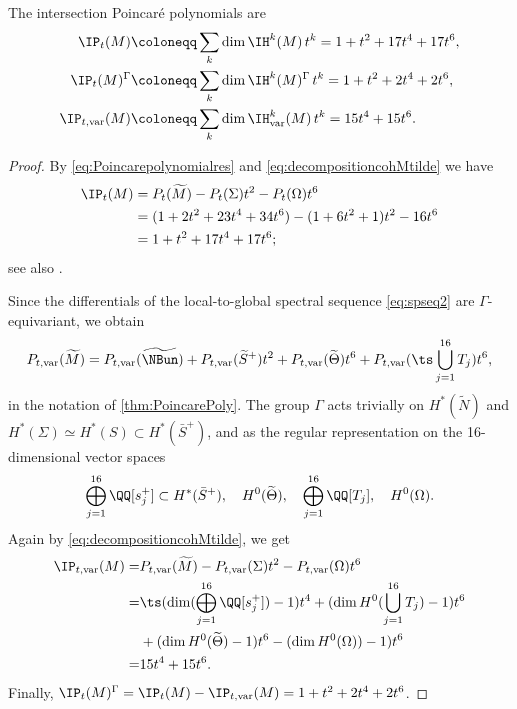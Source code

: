 \begin{prop}\label{prop:Poincarepolynomialintersection}
The intersection Poincaré polynomials are
\begin{align*}
\IP_t(M) & \coloneqq \sum_k \dim \IH^k(M)\,t^k = 1+t^2+17t^4+17t^6, \\
\IP_t(M)^{\Gamma}& \coloneqq \sum_k \dim \IH^k(M)^{\Gamma} \,t^k = 1+t^2+2t^4+2t^6,\\
\IP_{t,{\mathrm{var}}}(M) & \coloneqq \sum_k \dim \IH^k_{\mathrm{var}}(M) \,t^k = 15t^4+15t^6.
\end{align*}
\end{prop}
\begin{proof}

By \eqref{eq:Poincarepolynomialres} and \eqref{eq:decompositioncohMtilde} we have
\begin{align*}
\IP_t(M) & =P_t(\widetilde{M})-P_t(\Sigma)t^2-P_t(\Omega)t^6\\
& = (1+2t^2+23t^4+34t^6)-(1+6t^2+1)t^2 - 16t^6\\
& = 1+t^2+17t^4+17t^6;
\end{align*}
see also \cite[Th.\,6.1]{Felisetti2018}.

Since the differentials of the local-to-global spectral sequence \eqref{eq:spseq2} are $\Gamma$\nobreakdash-equiva\-riant, we obtain
\[
P_{t, \mathrm{var}}(\widetilde{M}) =P_{t, \mathrm{var}}(\widetilde{\NBun}) + P_{t, \mathrm{var}}(\widetilde{S}^+)t^2 + P_{t, \mathrm{var}}(\widetilde{\Theta})t^6 + P_{t, \mathrm{var}}(\ts\bigcup^{16}_{j=1}T_j)t^6,
\]
in the notation of \cref{thm:PoincarePoly}. The group $\Gamma$ acts trivially on $H^*(\widetilde{N})$ and $H^*(\Sigma) \simeq H^*(S) \subset H^*(\bar{S}^+)$, and as the regular representation on the 16-dimensional vector spaces
\[
\bigoplus^{16}_{j=1}\QQ [s^+_j] \subset H^*(\bar{S}^+), \quad H^0(\widetilde{\Theta}), \quad \bigoplus^{16}_{j=1}\QQ [T_j], \quad H^0(\Omega).
\]
Again by \eqref{eq:decompositioncohMtilde}, we get
\begin{align*}
\IP_{t, \mathrm{var}}(M) = & P_{t, \mathrm{var}}(\widetilde{M}) -P_{t, \mathrm{var}}(\Sigma)t^2-P_{t, \mathrm{var}}(\Omega)t^6\\
= & \ts(\dim(\bigoplus^{16}_{j=1}\QQ [s^+_j])-1)t^4 + (\dim H^0(\bigcup^{16}_{j=1} T_j)-1)t^6 \\
& + (\dim H^0(\widetilde{\Theta})-1)t^6 - (\dim H^0(\Omega))-1)t^6\\
= & 15t^4+15t^6.
\end{align*}
Finally, $\IP_t(M)^{\Gamma} = \IP_t(M) - \IP_{t, \mathrm{var}}(M)= 1+t^2+2t^4+2t^6$.
\end{proof}

